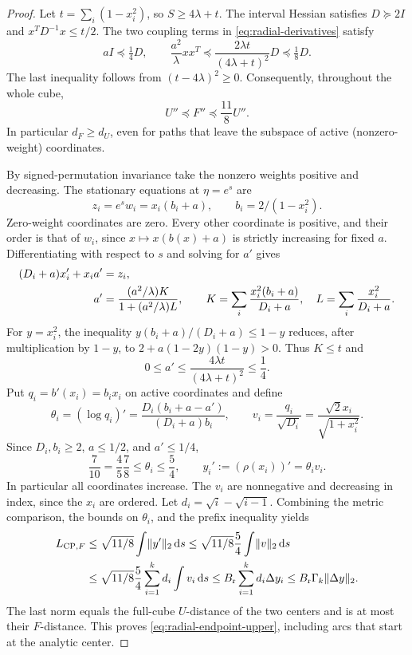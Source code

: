\begin{proof}
Let $t=\sum_i(1-x_i^2)$, so $S\geq4\lambda+t$.
The interval Hessian satisfies $D\succeq2I$ and
$x^TD^{-1}x\leq t/2$. The two coupling terms in
\eqref{eq:radial-derivatives} satisfy
\[
 aI\preceq\tfrac14D,\qquad
 \frac{a^2}{\lambda}xx^T\preceq
 \frac{2\lambda t}{(4\lambda+t)^2}D\preceq\tfrac18D.
\]
The last inequality follows from $(t-4\lambda)^2\geq0$.
Consequently, throughout the whole cube,
\begin{equation}
 U''\preceq F''\preceq\frac{11}{8}U''.
 \label{eq:radial-metric-comparison}
\end{equation}
In particular $d_F\geq d_U$, even for paths that leave the subspace of
active (nonzero-weight) coordinates.

By signed-permutation invariance take the nonzero weights positive
and decreasing. The stationary equations at $\eta=e^s$ are
\begin{equation}
 z_i=e^sw_i=x_i(b_i+a),\qquad b_i=2/(1-x_i^2).
 \label{eq:radial-central-equations}
\end{equation}
Zero-weight coordinates are zero. Every other coordinate is positive,
and their order is that of $w_i$, since $x\mapsto x(b(x)+a)$
is strictly increasing for fixed $a$.
Differentiating with respect to $s$ and solving for $a'$ gives
\begin{align}
 (D_i+a)x_i'+x_i a'&=z_i,\notag\\
 a'&=\frac{(a^2/\lambda)K}{1+(a^2/\lambda)L},\qquad
 K=\sum_i\frac{x_i^2(b_i+a)}{D_i+a},\quad
 L=\sum_i\frac{x_i^2}{D_i+a}.
 \label{eq:radial-a-prime}
\end{align}
For $y=x_i^2$, the inequality
$y(b_i+a)/(D_i+a)\leq1-y$ reduces, after multiplication
by $1-y$, to $2+a(1-2y)(1-y)>0$.
Thus $K\leq t$ and
\begin{equation}
 0\leq a'\leq\frac{4\lambda t}{(4\lambda+t)^2}\leq\frac14.
 \label{eq:radial-a-speed}
\end{equation}
Put $q_i=b'(x_i)=b_ix_i$ on active coordinates and define
\[
 \theta_i=(\log q_i)'=
 \frac{D_i(b_i+a-a')}{(D_i+a)b_i},\qquad
 v_i=\frac{q_i}{\sqrt{D_i}}=
 \frac{\sqrt2x_i}{\sqrt{1+x_i^2}}.
\]
Since $D_i,b_i\geq2$, $a\leq1/2$, and $a'\leq1/4$,
\begin{equation}
 \frac7{10}=\frac45\frac78\leq\theta_i\leq\frac54,
 \qquad y_i':=(\rho(x_i))'=\theta_i v_i.
 \label{eq:radial-ordered-speed}
\end{equation}
In particular all coordinates increase. The $v_i$ are nonnegative
and decreasing in index, since the $x_i$ are ordered.
Let $d_i=\sqrt i-\sqrt{i-1}$. Combining the metric comparison,
the bounds on $\theta_i$, and the prefix inequality yields
\begin{align*}
 L_{\mathrm{CP},F}&\leq\sqrt{11/8}\int\lVert y'\rVert_2\,\mathrm d s
 \leq\sqrt{11/8}\frac54\int\lVert v\rVert_2\,\mathrm d s\\
 &\leq\sqrt{11/8}\frac54\sum_{i=1}^k d_i\int v_i\,\mathrm d s
 \leq B_{\mathrm r}\sum_{i=1}^k d_i\Delta y_i
 \leq B_{\mathrm r}\Gamma_k\lVert \Delta y\rVert_2.
\end{align*}
The last norm equals the full-cube $U$-distance of the two centers
and is at most their $F$-distance. This proves
\eqref{eq:radial-endpoint-upper}, including arcs that start at the
analytic center.


\end{proof}
